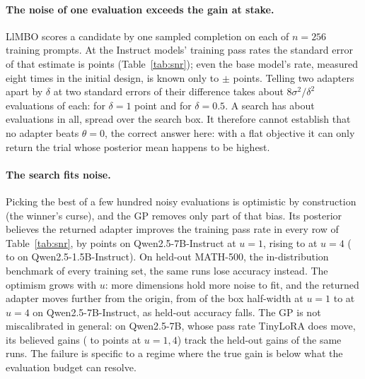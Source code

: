 \documentclass[twoside]{article}
\newcommand{\llmbo}{LlMBO}
\begin{document}
\paragraph{The noise of one evaluation exceeds the gain at stake.}
\llmbo{} scores a candidate by one sampled completion on each of $n = 256$ training prompts. At the Instruct models' training pass rates the standard error of that estimate is \snrSemInstruct{} points (Table~\ref{tab:snr}); even the base model's rate, measured eight times in the initial design, is known only to $\pm$\snrReplicateSem{} points. Telling two adapters apart by $\delta$ at two standard errors of their difference takes about $8\sigma^2/\delta^2$ evaluations of each: \snrEvalsOne{} for $\delta = 1$ point and \snrEvalsHalf{} for $\delta = 0.5$. A search has about \snrTrials{} evaluations in all, spread over the search box. It therefore cannot establish that no adapter beats $\theta = 0$, the correct answer here: with a flat objective it can only return the trial whose posterior mean happens to be highest.

\paragraph{The search fits noise.}
Picking the best of a few hundred noisy evaluations is optimistic by construction (the winner's curse), and the GP removes only part of that bias. Its posterior believes the returned adapter improves the training pass rate in every row of Table~\ref{tab:snr}, by \snrBelievedInstUOne{} points on Qwen2.5-7B-Instruct at $u = 1$, rising to \snrBelievedInstUFour{} at $u = 4$ (\snrBelievedInstSmallUOne{} to \snrBelievedInstSmallUFour{} on Qwen2.5-1.5B-Instruct). On held-out MATH-500, the in-distribution benchmark of every training set, the same runs lose accuracy instead. The optimism grows with $u$: more dimensions hold more noise to fit, and the returned adapter moves further from the origin, from \snrThetaInstUOne{} of the box half-width at $u = 1$ to \snrThetaInstUFour{} at $u = 4$ on Qwen2.5-7B-Instruct, as held-out accuracy falls. The GP is not miscalibrated in general: on Qwen2.5-7B, whose pass rate TinyLoRA does move, its believed gains (\snrBelievedQwenUOne{} to \snrBelievedQwenUFour{} points at $u = 1, 4$) track the held-out gains of the same runs. The failure is specific to a regime where the true gain is below what the evaluation budget can resolve.
\end{document}
